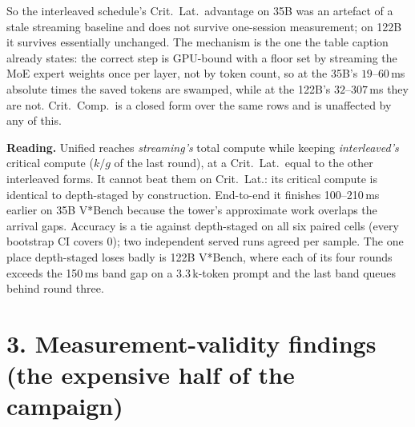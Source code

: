 \documentclass[10pt]{article}
\begin{document}
\noindent So the interleaved schedule's Crit.\ Lat.\ advantage on 35B was an artefact of a stale
streaming baseline and does not survive one-session measurement; on 122B it survives essentially
unchanged. The mechanism is the one the table caption already states: the correct step is GPU-bound
with a floor set by streaming the MoE expert weights once per layer, not by token count, so at the
35B's $19$--$60$\,ms absolute times the saved tokens are swamped, while at the 122B's
$32$--$307$\,ms they are not. Crit.\ Comp.\ is a closed form over the same rows and is unaffected
by any of this.

\noindent\textbf{Reading.} Unified reaches \emph{streaming's} total compute while keeping
\emph{interleaved's} critical compute ($k/g$ of the last round), at a Crit.\ Lat.\ equal to the
other interleaved forms. It cannot beat them on Crit.\ Lat.: its critical compute is identical to
depth-staged by construction. End-to-end it finishes 100--210\,ms earlier on 35B V*Bench because
the tower's approximate work overlaps the arrival gaps. Accuracy is a tie against depth-staged on
all six paired cells (every bootstrap CI covers 0); two independent served runs agreed per sample.
The one place depth-staged loses badly is 122B V*Bench, where each of its four rounds exceeds the
150\,ms band gap on a 3.3\,k-token prompt and the last band queues behind round three.

\section*{3. Measurement-validity findings (the expensive half of the campaign)}
\end{document}

